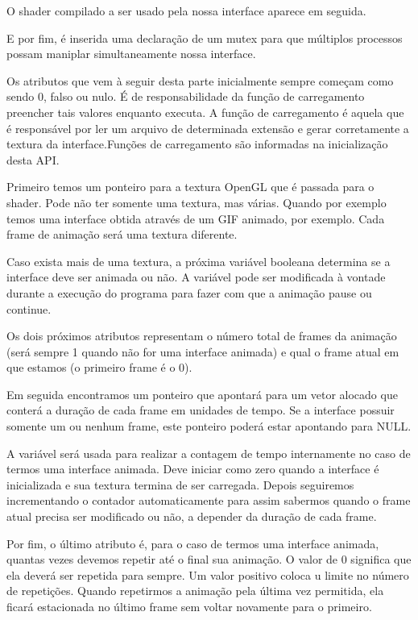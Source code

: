 O shader compilado a ser usado pela nossa interface aparece em
seguida.

E por fim, é inserida uma declaração de um mutex para que múltiplos
processos possam maniplar simultaneamente nossa interface.

Os atributos que vem à seguir desta parte inicialmente sempre começam
como sendo 0, falso ou nulo. É de responsabilidade da função de
carregamento preencher tais valores enquanto executa. A função de
carregamento é aquela que é responsável por ler um arquivo de
determinada extensão e gerar corretamente a textura da
interface.Funções de carregamento são informadas na inicialização
desta API.

Primeiro temos um ponteiro para a textura OpenGL que é passada para o
shader. Pode não ter somente uma textura, mas várias. Quando por
exemplo temos uma interface obtida através de um GIF animado, por
exemplo. Cada frame de animação será uma textura diferente.

Caso exista mais de uma textura, a próxima variável booleana determina
se a interface deve ser animada ou não. A variável pode ser modificada
à vontade durante a execução do programa para fazer com que a animação
pause ou continue.

Os dois próximos atributos representam o número total de frames da
animação (será sempre 1 quando não for uma interface animada) e qual o
frame atual em que estamos (o primeiro frame é o 0).

Em seguida encontramos um ponteiro que apontará para um vetor alocado
que conterá a duração de cada frame em unidades de tempo. Se a
interface possuir somente um ou nenhum frame, este ponteiro poderá
estar apontando para NULL.

A variável  será usada para realizar a contagem de
tempo internamente no caso de termos uma interface animada. Deve
iniciar como zero quando a interface é inicializada e sua textura
termina de ser carregada. Depois seguiremos incrementando o contador
automaticamente para assim sabermos quando o frame atual precisa ser
modificado ou não, a depender da duração de cada frame.

Por fim, o último atributo é, para o caso de termos uma interface
animada, quantas vezes devemos repetir até o final sua animação. O
valor de 0 significa que ela deverá ser repetida para sempre. Um valor
positivo coloca u limite no número de repetições. Quando repetirmos a
animação pela última vez permitida, ela ficará estacionada no último
frame sem voltar novamente para o primeiro.

